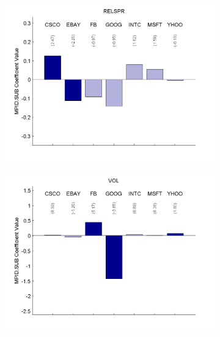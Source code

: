 \documentclass{article}
\begin{document}
\begin{figure}[htp!]
\caption{Coefficients from Firm-Level Post Regressions} \label{indreg2}

\begin{subfigure}{0.31\textwidth}
\includegraphics[width=\linewidth]{docs/Regression_Ratio_30sec_1_MPID_SUB_1MPIDLags_5DepVarLags.pdf}
\end{subfigure}
\hspace*{\fill}
\begin{subfigure}{0.31\textwidth}
\includegraphics[width=\linewidth]{docs/Regression_Ratio_30sec_6_MPID_SUB_1MPIDLags_5DepVarLags.pdf}
\end{subfigure}

\end{figure}
\end{document}
